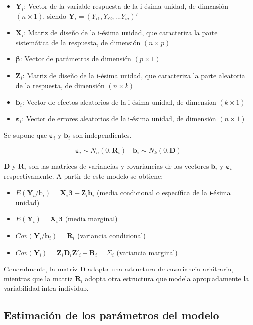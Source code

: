 \documentclass[spanish]{article}
\numberwithin{figure}{subsection}
\numberwithin{equation}{subsection}
\numberwithin{table}{subsection}
\begin{document}
\begin{itemize}
	\item $\bm{Y}_i$: Vector de la variable respuesta de la i-ésima unidad, de
	dimensión $(n \times 1)$, siendo $\bm{Y}_i = (Y_{i1}, Y_{i2}, ... Y_{in})'$
	\item $\bm{X}_i$: Matriz de diseño de la i-ésima unidad, que caracteriza la
	parte sistemática de la respuesta, de dimensión $(n \times p)$
	\item $\bm{\beta}$: Vector de parámetros de dimensión $(p \times 1)$
	\item $\bm{Z}_i$: Matriz de diseño de la i-ésima unidad, que caracteriza la
	parte aleatoria de la respuesta, de dimensión $(n \times k)$
	\item $\bm{b}_i$: Vector de efectos aleatorios de la i-ésima unidad, de
	dimensión $(k \times 1)$
	\item $\bm{\varepsilon}_i$: Vector de errores aleatorios de la i-ésima unidad,
	de dimensión $(n \times 1)$
\end{itemize}

Se supone que $\bm{\varepsilon}_i$ y $\bm{b}_i$ son independientes.

\[ \bm{\varepsilon}_i \sim N_{n}(0, \bm{R}_i) \quad \bm{b}_i \sim N_k(0, \bm{D}) \]

$\bm{D}$ y $\bm{R}_i$ son las matrices de variancias y covariancias de los
vectores $\bm{b}_i$ y $\bm{\varepsilon}_i$ respectivamente. A partir de este
modelo se obtiene:

\begin{itemize}
	\item $E(\bm{Y}_i/\bm{b}_i) = \bm{X}_i\bm{\beta} + \bm{Z}_i\bm{b}_i$ (media condicional o específica de
	la i-ésima unidad)
	\item $E(\bm{Y}_i) = \bm{X}_i\bm{\beta}$ (media marginal)
	\item $Cov(\bm{Y}_i/\bm{b}_i) = \bm{R}_i$ (variancia condicional)
	\item $Cov(\bm{Y}_i) = \bm{Z}_i \bm{D}_i \bm{Z}'_i + \bm{R}_i = \bm{\varSigma}_i$ (variancia marginal)
\end{itemize}

Generalmente, la matriz $\bm{D}$ adopta una estructura de covariancia
arbitraria, mientras que la matriz $\bm{R}_i$ adopta otra estructura que modela
apropiadamente la variabilidad intra individuo.

\subsection{Estimación de los parámetros del modelo}
\end{document}
